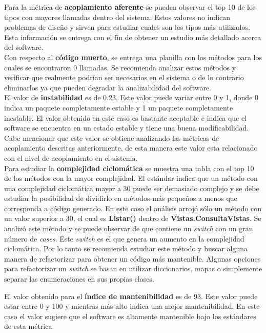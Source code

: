 Para la métrica de \textbf{acoplamiento aferente} se pueden observar el top 10 
de los tipos con mayores llamadas dentro del sistema. Estos valores no indican 
problemas de diseño y sirven para estudiar cuales son los tipos más utilizados. 
Esta información se entrega con el fín de obtener un estudio más detallado 
acerca del software.
\\

Con respecto al \textbf{código muerto}, se entrega una planilla con los métodos 
para los cuales se encontraron 0 llamadas. Se recomienda analizar estos métodos 
y verificar que realmente podrían ser necesarios en el sistema o de lo contrario 
eliminarlos ya que pueden degradar la analizabilidad del software.
\\

El valor de \textbf{instabilidad} es de 0.23. Este valor puede variar entre 
0 y 1, donde 0 indica un paquete completamente estable y 1 un paquete 
completamente inestable. El valor obtenido en este caso es bastante aceptable 
e indica que el software se encuentra en un estado estable y tiene una buena 
modificabilidad. Cabe mencionar que este valor se obtiene analizando las 
métricas de acoplamiento descritas anteriormente, de esta manera este valor 
esta relacionado con el nivel de acoplamiento en el sistema.
\\

Para estudiar la \textbf{complejidad ciclomática} se muestra una tabla con 
el top 10 de los métodos con la mayor complejidad. El estándar indica
que un método con una complejidad ciclomática mayor a 30 puede 
ser demasiado complejo y se debe estudiar la posibilidad de dividirlo en 
métodos más pequeños a menos que corresponda a código generado.
En este caso el análisis arrojó sólo un método con un valor superior a 30, 
el cual es \textbf{Listar()} dentro de \textbf{Vistas.ConsultaVistas}.
Se analizó este método y se puede observar de que contiene un \textit{switch} 
con un gran número de \textit{cases}. Este \textit{switch} es el que genera 
un aumento en la complejidad ciclomática. Por lo tanto se recomienda estudiar 
este método y buscar alguna manera de refactorizar para obtener un código 
más mantenible. Algunas opciones para refactorizar un \textit{switch} 
se basan en utilizar diccionarios, mapas o simplemente separar las enumeraciones 
en sus propias clases.

El valor obtenido para el \textbf{índice de mantenibilidad} es de 93. Este 
valor puede estar entre 0 y 100 y mientras más alto indica una mejor 
mantenibilidad. En este caso el valor sugiere que el software es altamente 
mantenible bajo los estándares de esta métrica.

